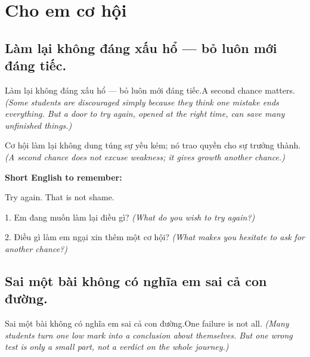 \chapter{Cho em cơ hội}


\section{Làm lại không đáng xấu hổ — bỏ luôn mới đáng tiếc.}
\begin{truyen}{Làm lại không đáng xấu hổ — bỏ luôn mới đáng tiếc.}{A second chance matters.}
\textit{(Some students are discouraged simply because they think one mistake ends everything. But a door to try again, opened at the right time, can save many unfinished things.)}
\end{truyen}

\begin{baihoc}
Cơ hội làm lại không dung túng sự yếu kém; nó trao quyền cho sự trưởng thành.
\textit{(A second chance does not excuse weakness; it gives growth another chance.)}
\end{baihoc}

\begin{ghinhoanh}
\textbf{Short English to remember:}

Try again. That is not shame.

\end{ghinhoanh}

\begin{tuhocnhanh}
1. Em đang muốn làm lại điều gì? \textit{(What do you wish to try again?)}

2. Điều gì làm em ngại xin thêm một cơ hội? \textit{(What makes you hesitate to ask for another chance?)}
\end{tuhocnhanh}
\ngancach


\section{Sai một bài không có nghĩa em sai cả con đường.}
\begin{truyen}{Sai một bài không có nghĩa em sai cả con đường.}{One failure is not all.}
\textit{(Many students turn one low mark into a conclusion about themselves. But one wrong test is only a small part, not a verdict on the whole journey.)}
\end{truyen}

